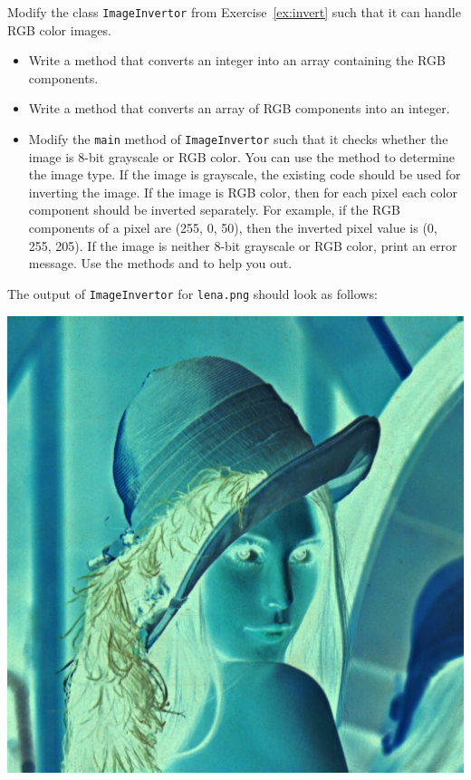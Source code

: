 \documentclass{book}
\begin{document}
\begin{exercise}
Modify the class \texttt{ImageInvertor} from Exercise~\ref{ex:invert} such that it can handle RGB color images.
\begin{itemize}
  \item Write a method  that converts an integer into an array containing the RGB components.
  \item Write a method  that converts an array of RGB components into an integer.
  \item Modify the \texttt{main} method of \texttt{ImageInvertor}  such that it checks whether the image is 8-bit grayscale or RGB color. You can use the method  to determine the image type. If the image is grayscale, the existing code should be used for inverting the image. If the image is RGB color, then for each pixel each color component should be inverted separately. For example, if the RGB components of a pixel are (255, 0, 50), then the inverted pixel value is (0, 255, 205). If the image is neither 8-bit grayscale or RGB color, print an error message. Use the methods  and  to help you out.
\end{itemize}
The output of \texttt{ImageInvertor} for \texttt{lena.png} should look as follows:
\begin{center}
\includegraphics[scale=0.2]{lena-inverted.png}
\end{center}
\end{exercise}
\end{document}
